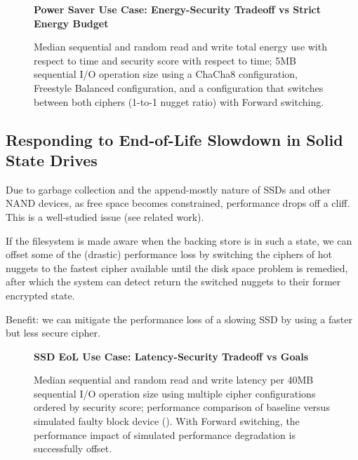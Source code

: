 
\begin{figure}[ht] \textbf{Power Saver Use Case: Energy-Security Tradeoff vs
   Strict Energy Budget}\par\medskip
   \centering
   {} \caption{Median sequential and random
   read and write total energy use with respect to time and security score with
   respect to time; 5MB sequential I/O operation size using a ChaCha8
   configuration, Freestyle Balanced configuration, and a configuration that
   switches between both ciphers (1-to-1 nugget ratio) with Forward switching.}
  \label{fig:usecase-battery}
\end{figure}

\subsection{Responding to End-of-Life Slowdown in Solid State Drives}

Due to garbage collection and the append-mostly nature of SSDs and other NAND
devices, as free space becomes constrained, performance drops off a cliff. This
is a well-studied issue (see related work).

If the filesystem is made aware when the backing store is in such a state, we
can offset some of the (drastic) performance loss by switching the ciphers of
hot nuggets to the fastest cipher available until the disk space problem is
remedied, after which the system can detect return the switched nuggets to their
former encrypted state.

Benefit: we can mitigate the performance loss of a slowing SSD by using a faster
but less secure cipher.

\begin{figure}[ht] \textbf{SSD EoL Use Case: Latency-Security Tradeoff vs
   Goals}\par\medskip
   \centering
   {} \caption{Median sequential and
   random read and write latency per 40MB sequential I/O operation size using
   multiple cipher configurations ordered by security score; performance
   comparison of baseline versus simulated faulty block device (). With Forward switching, the performance impact of
   simulated performance degradation is successfully offset.}
  \label{fig:usecase-eol-tradeoff}
\end{figure}

